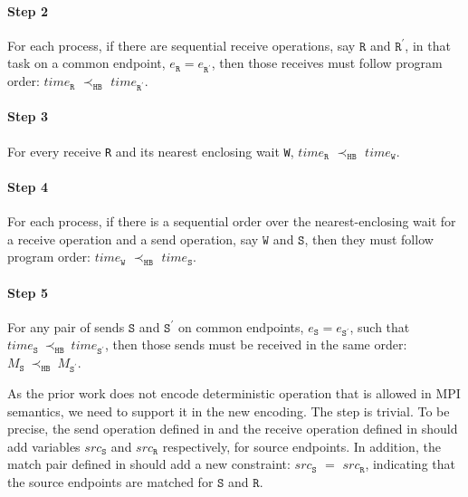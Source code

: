 \paragraph*{Step 2} For each process, if there are sequential receive
operations, say $\mathtt{R}$ and $\mathtt{R^\prime}$, in that task
on a common endpoint, $e_\mathtt{R} = e_\mathtt{R^\prime}$, then those
receives must follow program order: $\mathit{time}_\mathtt{R}$
$\prec_\mathtt{HB}$ $\mathit{time}_\mathtt{R^\prime}$.

\paragraph*{Step 3} For every receive \texttt{R} and its nearest
enclosing wait \texttt{W}, $\mathit{time}_\mathtt{R}$
$\prec_\mathtt{HB}$ $\mathit{time}_\mathtt{W}$.

\paragraph*{Step 4} For each process, if there is a sequential order over the nearest-enclosing wait for a receive operation and a send operation, say $\mathtt{W}$ and $\mathtt{S}$, then they must follow program order: $\mathit{time}_\mathtt{W}$
$\prec_\mathtt{HB}$ $\mathit{time}_\mathtt{S}$.

\paragraph*{Step 5} For any pair of sends $\mathtt{S}$ and
$\mathtt{S^\prime}$ on common endpoints, $e_{\mathtt{S}}=e_{\mathtt{S^\prime}}$,
such that
$\mathit{time}_\mathtt{S}\ \mathrm{\prec_\mathtt{HB}}\ \mathit{time}_\mathtt{S^\prime}$,
then those sends must be received in the same order:
$M_{\mathtt{S}}\ \mathrm{\prec_{\mathtt{HB}}}\ M_{\mathtt{S^\prime}}$.

As the prior work does not encode deterministic operation that is allowed in MPI semantics, we need to support it in the new encoding. The step is trivial. To be precise, the send operation defined in  and the receive operation defined in  should add variables $src_\mathtt{S}$ and $src_\mathtt{R}$ respectively, for source endpoints. In addition, the match pair defined in  should add a new constraint: $src_\mathtt{S}$ $=$ $src_\mathtt{R}$, indicating that the source endpoints are matched for $\mathtt{S}$ and $\mathtt{R}$.

